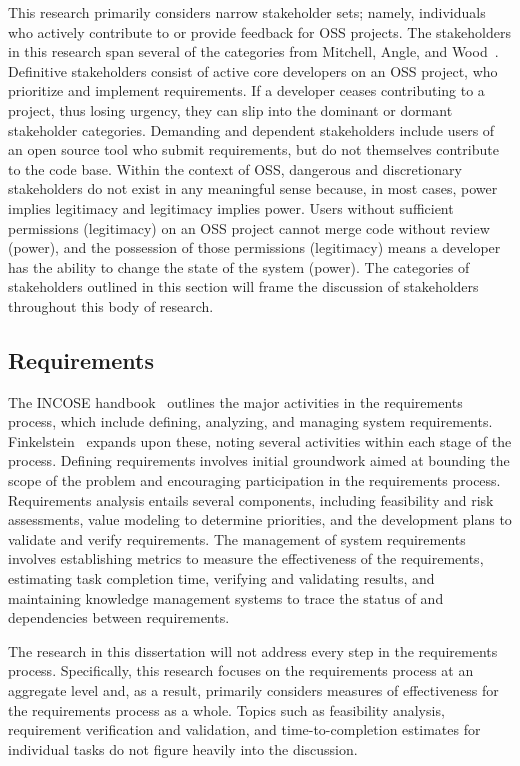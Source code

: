 This research primarily considers narrow stakeholder sets; namely, individuals who actively contribute to or provide feedback for OSS projects. The stakeholders in this research span several of the categories from Mitchell, Angle, and Wood~\cite{mitchell}. Definitive stakeholders consist of active core developers on an OSS project, who prioritize and implement requirements. If a developer ceases contributing to a project, thus losing urgency, they can slip into the dominant or dormant stakeholder categories. Demanding and dependent stakeholders include users of an open source tool who submit requirements, but do not themselves contribute to the code base. Within the context of OSS, dangerous and discretionary stakeholders do not exist in any meaningful sense because, in most cases, power implies legitimacy and legitimacy implies power. Users without sufficient permissions (legitimacy) on an OSS project cannot merge code without review (power), and the possession of those permissions (legitimacy) means a developer has the ability to change the state of the system (power). The categories of stakeholders outlined in this section will frame the discussion of stakeholders throughout this body of research.

\subsection{Requirements}

The INCOSE handbook~\cite{incose} outlines the major activities in the requirements process, which include defining, analyzing, and managing system requirements. Finkelstein~\cite{finkelstein} expands upon these, noting several activities within each stage of the process. Defining requirements involves initial groundwork aimed at bounding the scope of the problem and encouraging participation in the requirements process. Requirements analysis entails several components, including feasibility and risk assessments, value modeling to determine priorities, and the development plans to validate and verify requirements. The management of system requirements involves establishing metrics to measure the effectiveness of the requirements, estimating task completion time, verifying and validating results, and maintaining knowledge management systems to trace the status of and dependencies between requirements. 

The research in this dissertation will not address every step in the requirements process. Specifically, this research focuses on the requirements process at an aggregate level and, as a result, primarily considers measures of effectiveness for the requirements process as a whole. Topics such as feasibility analysis, requirement verification and validation, and time-to-completion estimates for individual tasks do not figure heavily into the discussion.

